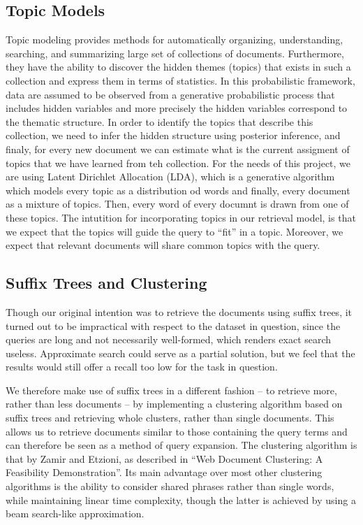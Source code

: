 \documentclass[11pt, a4paper, abstraction]{scrartcl}
\begin{document}
\subsection{Topic Models}
Topic modeling provides methods for automatically organizing, understanding, searching, and summarizing large set of collections of documents. Furthermore, they have the ability to discover the hidden themes (topics) that exists in such a collection and express them in terms of statistics. In this probabilistic framework, data are assumed to be observed from a generative probabilistic process that includes hidden variables and more precisely the hidden variables correspond to the thematic structure. In order to identify the topics that describe this collection, we need to infer the hidden structure using posterior inference, and finaly, for every new document we can estimate what is the current assigment of topics that we have learned from teh collection. 
For the needs of this project, we are using Latent Dirichlet Allocation (LDA), which is a generative algorithm which models every topic as a distribution od words and finally, every document as a mixture of topics. Then, every word of every documnt is drawn from one of these topics. 
The intutition for incorporating topics in our retrieval model, is that we expect that the topics will guide the query to ``fit'' in a topic. Moreover, we expect that relevant documents will share common topics with the query.

\subsection{Suffix Trees and Clustering}
Though our original intention was to retrieve the documents using suffix trees, it turned out to be impractical with respect to the dataset in question, since the queries are long and not necessarily well-formed, which renders exact search useless. Approximate search could serve as a partial solution, but we feel that the results would still offer a recall too low for the task in question.

We therefore make use of suffix trees in a different fashion -- to retrieve more, rather than less documents -- by implementing a clustering algorithm based on suffix trees and retrieving whole clusters, rather than single documents. This allows us to retrieve documents similar to those containing the query terms and can therefore be seen as a method of query expansion. The clustering algorithm is that by Zamir and Etzioni, as described in ``Web Document Clustering: A Feasibility Demonstration''. Its main advantage over most other clustering algorithms is the ability to consider shared phrases rather than single words, while maintaining linear time complexity, though the latter is achieved by using a beam search-like approximation.
\end{document}
